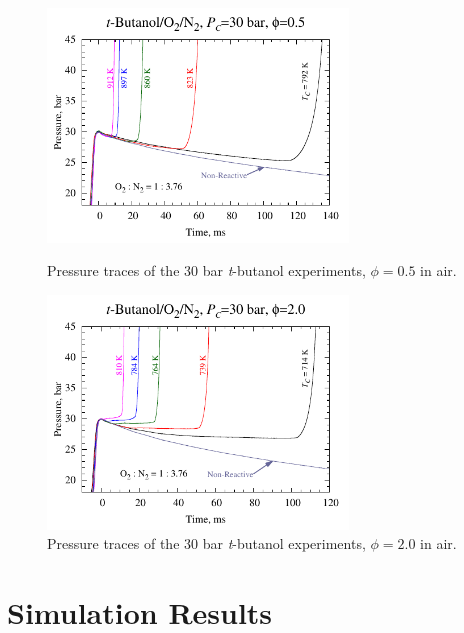 \documentclass[12pt, letterpaper]{article}
\begin{document}
\begin{figure}
    \centering
    \begin{minipage}{0.45\textwidth}
        \includegraphics[width=8cm]{03-Butanol/tbuoh-phi05}
        \caption{Pressure traces of the 30 bar \textit{t}-butanol experiments,
            $\phi=0.5$ in air.}
        \label{fig:tbuoh-phi05}
    \end{minipage}
    \quad
    \begin{minipage}{0.45\textwidth}
        \includegraphics[width=8cm]{03-Butanol/tbuoh-phi20}
        \caption{Pressure traces of the 30 bar \textit{t}-butanol experiments,
            $\phi=2.0$ in air.}
        \label{fig:tbuoh-phi20}
    \end{minipage}
\end{figure}

\section{Simulation Results}
\label{sec:buoh-sims}
\end{document}
